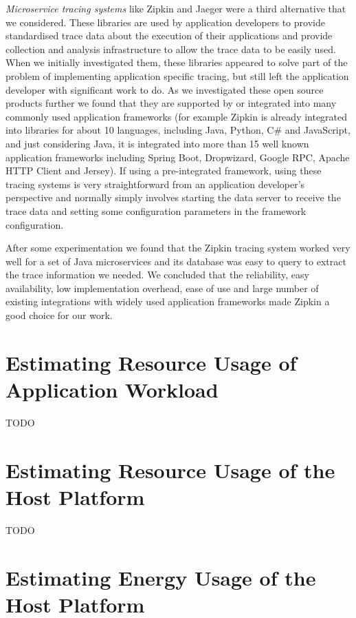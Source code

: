 \emph{Microservice tracing systems} like Zipkin and Jaeger \cite{zipkin2018, jaeger2018} were a third alternative that we considered.  These libraries are used by application developers to provide standardised trace data about the execution of their applications and provide collection and analysis infrastructure to allow the trace data to be easily used.  When we initially investigated them, these libraries appeared to solve part of the problem of implementing application specific tracing, but still left the application developer with significant work to do.  As we investigated these open source products further we found that they are supported by or integrated into many commonly used application frameworks (for example Zipkin is already integrated into libraries for about 10 languages, including Java, Python, C\# and JavaScript, and just considering Java, it is integrated into more than 15 well known application frameworks including Spring Boot, Dropwizard, Google RPC, Apache HTTP Client and Jersey).  If using a pre-integrated framework, using these tracing systems is very straightforward from an application developer's perspective and normally simply involves starting the data server to receive the trace data and setting some configuration parameters in the framework configuration.

After some experimentation we found that the Zipkin tracing system worked very well for a set of Java microservices and its database was easy to query to extract the trace information we needed.  We concluded that the reliability, easy availability, low implementation overhead, ease of use and large number of existing integrations with widely used application frameworks made Zipkin a good choice for our work.

\section{Estimating Resource Usage of Application Workload}

TODO

\section{Estimating Resource Usage of the Host Platform}

TODO

\section{Estimating Energy Usage of the Host Platform}

